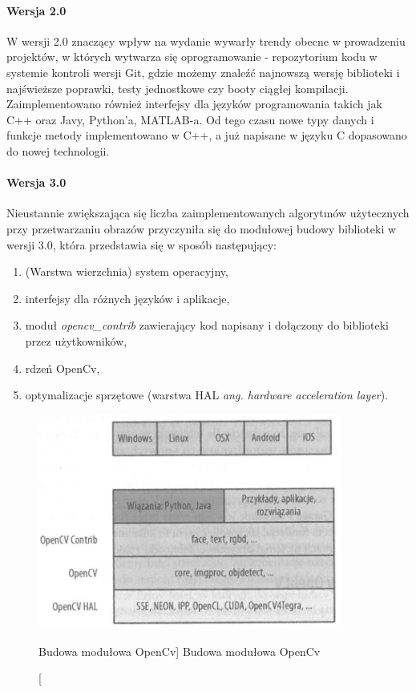 \documentclass[a4paper,12pt]{article}
\begin{document}
			\paragraph{\noindent Wersja 2.0}
				W wersji 2.0 znaczący wpływ na wydanie wywarły trendy obecne w prowadzeniu projektów, w których wytwarza się oprogramowanie - repozytorium kodu w systemie kontroli wersji Git, gdzie możemy znaleźć najnowszą wersję biblioteki i najświeższe poprawki, testy jednostkowe czy booty ciągłej kompilacji. 
				Zaimplementowano również interfejsy dla języków programowania takich jak C++ oraz Javy, Python’a, MATLAB-a.
				Od tego czasu nowe typy danych i funkcje metody implementowano w C++, a już napisane w języku C dopasowano do nowej technologii.
			\paragraph{ \noindent Wersja 3.0}
				Nieustannie zwiększająca się liczba zaimplementowanych algorytmów użytecznych przy przetwarzaniu obrazów przyczyniła się do modułowej budowy biblioteki w wersji 3.0, która przedstawia się w sposób następujący:


				\begin{enumerate}
					\item (Warstwa wierzchnia) system operacyjny,
					\item interfejsy dla różnych języków i aplikacje,
					\item moduł \textit {opencv\_contrib} zawierający kod napisany i dołączony do biblioteki przez użytkowników,
					\item rdzeń OpenCv,
					\item optymalizacje sprzętowe (warstwa HAL \textit {ang. hardware acceleration layer}).
				\end{enumerate} 

				\begin{figure}[!ht]   %
					\begin{center}
						\includegraphics[width=10cm] {budowaModulowa.png} 
					\end{center}
					\caption
					[Budowa modułowa OpenCv]  %
					{Budowa modułowa OpenCv}  %
				\end{figure}
\end{document}
